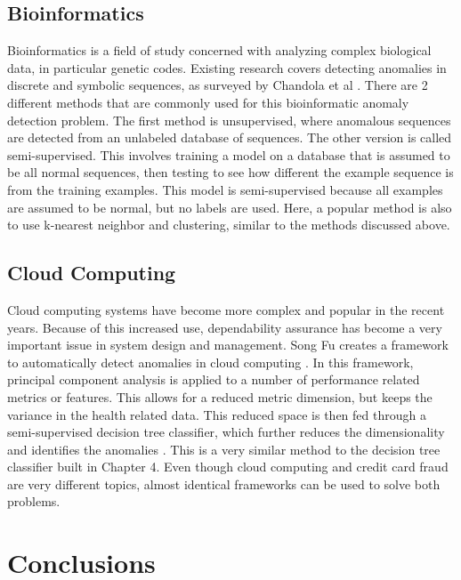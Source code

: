 \documentclass[midd]{thesis}
\begin{document}
\section{Bioinformatics}

Bioinformatics is a field of study concerned with analyzing complex biological data, in particular genetic codes. Existing research covers detecting anomalies in discrete and symbolic sequences, as surveyed by Chandola et al \cite{Chandola2012}. There are 2 different methods that are commonly used for this bioinformatic anomaly detection problem. The first method is unsupervised, where anomalous sequences are detected from an unlabeled database of sequences. The other version is called semi-supervised. This involves training a model on a database that is assumed to be all normal sequences, then testing to see how different the example sequence is from the training examples. This model is semi-supervised because all examples are assumed to be normal, but no labels are used. Here, a popular method is also to use k-nearest neighbor and clustering, similar to the methods discussed above. 


\section{Cloud Computing}

Cloud computing systems have become more complex and popular in the recent years. Because of this increased use, dependability assurance has become a very important issue in system design and management. Song Fu creates a framework to automatically detect anomalies in cloud computing  \cite{SongFu2011}. In this framework, principal component analysis is applied to a number of performance related metrics or features. This allows for a reduced metric dimension, but keeps the variance in the health related data. This reduced space is then fed through a semi-supervised decision tree classifier, which further reduces the dimensionality and identifies the anomalies \cite{SongFu2011}. This is a very similar method to the decision tree classifier built in Chapter 4. Even though cloud computing and credit card fraud are very different topics, almost identical frameworks can be used to solve both problems.


\pagebreak
\chapter{Conclusions}
\label{sec:conclusion}
\end{document}
